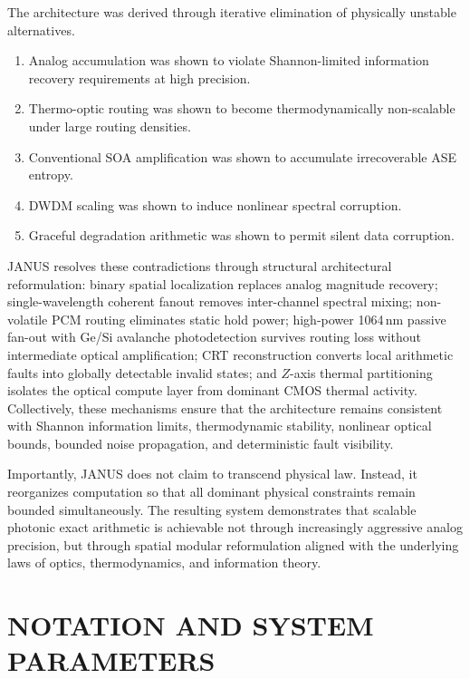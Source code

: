 \documentclass[journal]{IEEEtran}
\begin{document}
The architecture was derived through iterative elimination of physically unstable alternatives.
\begin{enumerate}
\item  Analog accumulation was shown to violate Shannon-limited information recovery requirements at high precision.
\item  Thermo-optic routing was shown to become thermodynamically non-scalable under large routing densities.
\item  Conventional SOA amplification was shown to accumulate irrecoverable ASE entropy.
\item  DWDM scaling was shown to induce nonlinear spectral corruption.
\item  Graceful degradation arithmetic was shown to permit silent data corruption.
\end{enumerate}

JANUS resolves these contradictions through structural architectural reformulation: binary spatial localization replaces analog magnitude recovery; single-wavelength coherent fanout removes inter-channel spectral mixing; non-volatile PCM routing eliminates static hold power; high-power 1064\,nm passive fan-out with Ge/Si avalanche photodetection survives routing loss without intermediate optical amplification; CRT reconstruction converts local arithmetic faults into globally detectable invalid states; and $Z$-axis thermal partitioning isolates the optical compute layer from dominant CMOS thermal activity. Collectively, these mechanisms ensure that the architecture remains consistent with Shannon information limits, thermodynamic stability, nonlinear optical bounds, bounded noise propagation, and deterministic fault visibility.

Importantly, JANUS does not claim to transcend physical law. Instead, it reorganizes computation so that all dominant physical constraints remain bounded simultaneously. The resulting system demonstrates that scalable photonic exact arithmetic is achievable not through increasingly aggressive analog precision, but through spatial modular reformulation aligned with the underlying laws of optics, thermodynamics, and information theory.

\appendices

\section{NOTATION AND SYSTEM PARAMETERS}
\label{app:notation}
\end{document}
